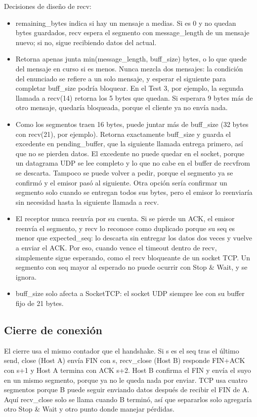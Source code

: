 \documentclass[
	spanish, %
	letterpaper, oneside
]{article}
\newcommand{\code}[1]{#1}     %
\newcommand{\flag}[1]{#1}     %
\newcommand{\field}[1]{#1}    %
\begin{document}
Decisiones de diseño de \code{recv}:
\begin{itemize}
	\item \field{remaining\_bytes} indica si hay un mensaje a medias. Si es 0 y no quedan bytes
	guardados, \code{recv} espera el segmento con \field{message\_length} de un mensaje nuevo; si
	no, sigue recibiendo datos del actual.
	\item Retorna apenas junta \code{min(message\_length, buff\_size)} bytes, o lo que quede del
	mensaje en curso si es menos. Nunca mezcla dos mensajes: la condición del enunciado se refiere
	a un solo mensaje, y esperar el siguiente para completar \field{buff\_size} podría bloquear.
	En el Test 3, por ejemplo, la segunda llamada a \code{recv(14)} retorna los 5 bytes que quedan.
	Si esperara 9 bytes más de otro mensaje, quedaría bloqueada, porque el cliente ya no envía
	nada.
	\item Como los segmentos traen 16 bytes, puede juntar más de \field{buff\_size} (32 bytes con
	\code{recv(21)}, por ejemplo). Retorna exactamente \field{buff\_size} y guarda el excedente en
	\field{pending\_buffer}, que la siguiente llamada entrega primero, así que no se pierden datos.
	El excedente no puede quedar en el socket, porque un datagrama UDP se lee completo y lo que no
	cabe en el buffer de \code{recvfrom} se descarta. Tampoco se puede volver a pedir, porque el
	segmento ya se confirmó y el emisor pasó al siguiente. Otra opción sería confirmar un segmento
	solo cuando se entregan todos sus bytes, pero el emisor lo reenviaría sin necesidad hasta la
	siguiente llamada a \code{recv}.
	\item El receptor nunca reenvía por su cuenta. Si se pierde un \flag{ACK}, el emisor reenvía el
	segmento, y \code{recv} lo reconoce como duplicado porque su \field{seq} es menor que
	\field{expected\_seq}: lo descarta sin entregar los datos dos veces y vuelve a enviar el
	\flag{ACK}. Por eso, cuando vence el timeout dentro de \code{recv}, simplemente sigue esperando,
	como el \code{recv} bloqueante de un socket TCP. Un segmento con \field{seq} mayor al esperado
	no puede ocurrir con Stop \& Wait, y se ignora.
	\item \field{buff\_size} solo afecta a \code{SocketTCP}: el socket UDP siempre lee con su
	buffer fijo de 21 bytes.
\end{itemize}

\subsection{Cierre de conexión}
El cierre usa el mismo contador que el handshake. Si s es el \field{seq} tras el último
\code{send}, \code{close} (Host A) envía \flag{FIN} con s, \code{recv\_close} (Host B) responde
\flag{FIN+ACK} con s+1 y Host A termina con \flag{ACK} s+2. Host B confirma el \flag{FIN} y envía
el suyo en un mismo segmento, porque ya no le queda nada por enviar. TCP usa cuatro segmentos
porque B puede seguir enviando datos después de recibir el \flag{FIN} de A. Aquí
\code{recv\_close} solo se llama cuando B terminó, así que separarlos solo agregaría otro
Stop \& Wait y otro punto donde manejar pérdidas.
\end{document}
